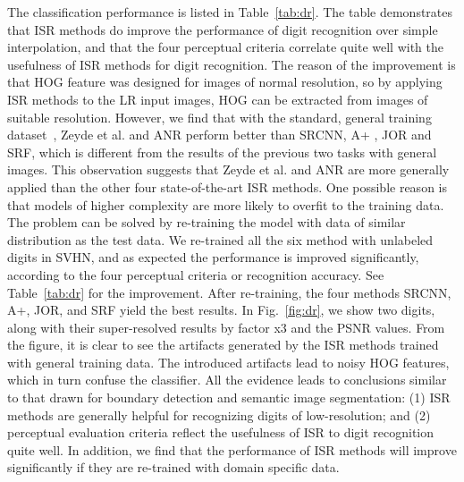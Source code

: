 \documentclass[10pt,twocolumn,letterpaper]{article}
\begin{document}
The classification performance is listed in Table~\ref{tab:dr}. The table demonstrates that ISR methods do improve the
performance of digit recognition over simple interpolation, and that
the four perceptual criteria correlate quite well with the usefulness
of ISR methods for digit recognition. The reason of the improvement is
that HOG feature was designed for images of normal resolution, so by
applying ISR methods to the LR input images, HOG can be extracted from
images of suitable resolution.  However, we find that with the
standard, general training dataset~\cite{Yang-TIP-2010}, Zeyde et
al. and ANR perform better than SRCNN, A+ , JOR and SRF, which is different
from the results of the previous two tasks with general images. This observation
suggests that Zeyde et al. and ANR are more generally applied than the
other four state-of-the-art ISR methods. One possible reason is that models 
of higher complexity are more likely to overfit to the training data. 
The problem can be solved by
re-training the model with data of similar distribution as the test data. We re-trained
all the six method with unlabeled digits in SVHN, and as expected the
performance is improved significantly, according to the four perceptual criteria or 
recognition accuracy. See Table~\ref{tab:dr} for the improvement. After re-training, 
the four methods SRCNN, A+, JOR, and SRF yield the best results.  
 In Fig.~\ref{fig:dr}, we show
two digits, along with their super-resolved results by factor x3
and the PSNR values. From the figure, it is clear to see the artifacts
generated by the ISR methods trained with general training data. The
introduced artifacts lead to noisy HOG features, which in turn confuse
the classifier. All the evidence leads to conclusions similar to that
drawn for boundary detection and semantic image segmentation: (1) ISR methods are
generally helpful for recognizing digits of low-resolution; and (2)
perceptual evaluation criteria reflect the usefulness of ISR
to digit recognition quite well.  In addition, we find that the performance of
ISR methods will improve significantly if they are re-trained with domain specific
data.
\end{document}

